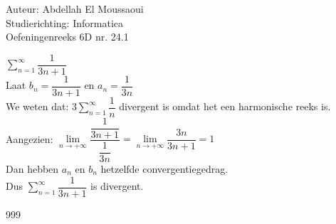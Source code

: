 \documentclass[a4paper]{article}
\begin{document}
  
\noindent \large Auteur: Abdellah El Moussaoui \\
\noindent \large Studierichting: Informatica\\
\noindent \large Oefeningenreeks 6D nr. 24.1\\

\medskip

\normalsize


$\displaystyle\sum_{n=1}^{\infty}\dfrac{1}{3n+1}$\\

Laat $b_n = \dfrac{1}{3n+1}$ en $a_n = \dfrac{1}{3n}$\\

We weten dat: $\displaystyle 3 \sum_{n=1}^{\infty}\dfrac{1}{n}$ divergent is omdat het een harmonische reeks is.\\

Aangezien: $\lim\limits_{n\to+\infty} \dfrac{\dfrac{1}{3n+1}}{\dfrac{1}{3n}} = \lim\limits_{n\to+\infty} \dfrac{3n}{3n+1} = 1$\\

Dan hebben $a_n$ en $b_n$ hetzelfde convergentiegedrag.\\

Dus $\displaystyle\sum_{n=1}^{\infty}\dfrac{1}{3n+1}$ is divergent.\\



\begin{thebibliography}{999}
\end{thebibliography}
\end{document}
